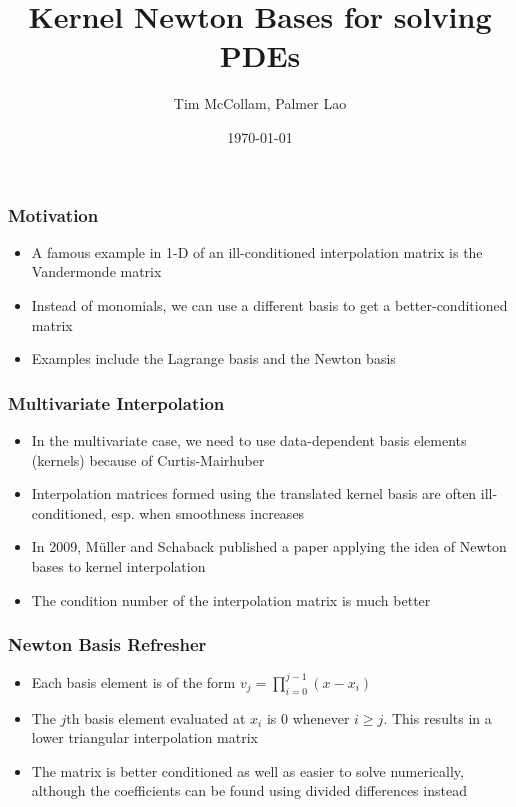 \documentclass{beamer}
\title[Newton Bases and PDEs]{Kernel Newton Bases for solving PDEs} %
\author{Tim McCollam, Palmer Lao} %
\institute[IIT, CU] %
{
Illinois Institute of Technology, Clarkson University \\ %
\medskip
\textit{tmccolla@hawk.iit.edu, laopa@clarkson.edu} %
}
\date{\today} %
\begin{document}
\begin{frame}
\titlepage %
\end{frame}



\begin{frame}
\frametitle{Motivation}
\begin{itemize}
\item A famous example in 1-D of an ill-conditioned interpolation matrix is the Vandermonde matrix
\item Instead of monomials, we can use a different basis to get a better-conditioned matrix
\item Examples include the Lagrange basis and the Newton basis
\end{itemize}
\end{frame}

\begin{frame}
\frametitle{Multivariate Interpolation}
\begin{itemize}
\item In the multivariate case, we need to use data-dependent basis elements (kernels) because of Curtis-Mairhuber
\item Interpolation matrices formed using the translated kernel basis are often ill-conditioned, esp. when smoothness increases
\item In 2009, Müller and Schaback published a paper applying the idea of Newton bases to kernel interpolation
\item The condition number of the interpolation matrix is much better
\end{itemize}
\end{frame}

\begin{frame}
\frametitle{Newton Basis Refresher}
\begin{itemize}
\item Each basis element is of the form $v_j = \prod_{i=0}^{j-1}(x-x_i)$
\item The $j$th basis element evaluated at $x_i$ is 0 whenever $i \geq j$. This results in a lower triangular interpolation matrix
\item The matrix is better conditioned as well as easier to solve numerically, although the coefficients can be found using divided differences instead
\end{itemize}
\end{frame}
\end{document}
